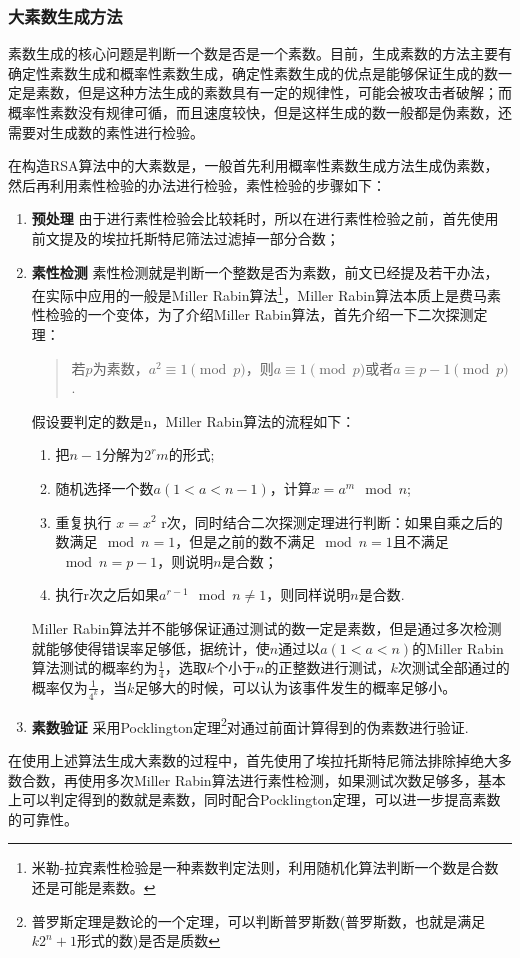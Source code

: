 \documentclass[UTF8]{ctexart}
\begin{document}
\subsubsection{大素数生成方法}
素数生成的核心问题是判断一个数是否是一个素数。目前，生成素数的方法主要有确定性素数生成和概率性素数生成，确定性素数生成的优点是能够保证生成的数一定是素数，但是这种方法生成的素数具有一定的规律性，可能会被攻击者破解；而概率性素数没有规律可循，而且速度较快，但是这样生成的数一般都是伪素数，还需要对生成数的素性进行检验。

在构造RSA算法中的大素数是，一般首先利用概率性素数生成方法生成伪素数，然后再利用素性检验的办法进行检验，素性检验的步骤如下：

\begin{enumerate}
	\item \textbf{预处理} \qquad 由于进行素性检验会比较耗时，所以在进行素性检验之前，首先使用前文提及的埃拉托斯特尼筛法过滤掉一部分合数；
	\item \textbf{素性检测} \qquad 素性检测就是判断一个整数是否为素数，前文已经提及若干办法，在实际中应用的一般是Miller Rabin算法\footnote{米勒-拉宾素性检验是一种素数判定法则，利用随机化算法判断一个数是合数还是可能是素数。}，Miller Rabin算法本质上是费马素性检验的一个变体，为了介绍Miller Rabin算法，首先介绍一下二次探测定理：
	\begin{quote}
		若$p$为素数，$a^2 \equiv 1 \pmod{p}$，则$a \equiv 1 \pmod{p}$或者$a \equiv p - 1 \pmod{p}$.
	\end{quote}
	假设要判定的数是n，Miller Rabin算法的流程如下：
	\begin{enumerate}
		\item 把$n-1$分解为$2^{r}m$的形式;
		\item 随机选择一个数$a(1<a<n-1)$，计算$x = a^m \mod n$;
		\item 重复执行 $x = x^2$ r次，同时结合二次探测定理进行判断：如果自乘之后的数满足$\mod{n} = 1$，但是之前的数不满足$\mod{n} = 1$且不满足$\mod{n} = p-1$，则说明$n$是合数；
		\item 执行r次之后如果$a^{r-1} \mod n \ne 1$，则同样说明$n$是合数.
	\end{enumerate}

	Miller Rabin算法并不能够保证通过测试的数一定是素数，但是通过多次检测就能够使得错误率足够低，据统计，使$n$通过以$a(1 < a < n)$的Miller Rabin算法测试的概率约为$\frac{1}{4}$，选取$k$个小于$n$的正整数进行测试，$k$次测试全部通过的概率仅为$\frac{1}{4^k}$，当$k$足够大的时候，可以认为该事件发生的概率足够小。

	\item \textbf{素数验证} \qquad 采用Pocklington定理\footnote{普罗斯定理是数论的一个定理，可以判断普罗斯数(普罗斯数，也就是满足$k2^n + 1$形式的数)是否是质数}对通过前面计算得到的伪素数进行验证.
\end{enumerate}

在使用上述算法生成大素数的过程中，首先使用了埃拉托斯特尼筛法排除掉绝大多数合数，再使用多次Miller Rabin算法进行素性检测，如果测试次数足够多，基本上可以判定得到的数就是素数，同时配合Pocklington定理，可以进一步提高素数的可靠性。

\nocite{*} %
\end{document}
